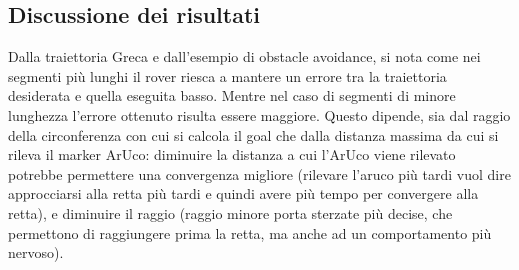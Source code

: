\subsection{Discussione dei risultati}
Dalla traiettoria Greca e dall'esempio di obstacle avoidance, si nota come nei segmenti più lunghi il rover riesca a mantere un errore tra la traiettoria desiderata e quella eseguita basso. Mentre nel caso di segmenti di minore lunghezza l'errore ottenuto risulta essere maggiore. Questo dipende, sia dal raggio della circonferenza con cui si calcola il goal che dalla distanza massima da cui si rileva il marker ArUco: diminuire la distanza a cui l'ArUco viene rilevato potrebbe permettere una convergenza migliore (rilevare l'aruco più tardi vuol dire approcciarsi alla retta più tardi e quindi avere più tempo per convergere alla retta), e diminuire il raggio (raggio minore porta sterzate più decise, che permettono di raggiungere prima la retta, ma anche ad un comportamento più nervoso).  
